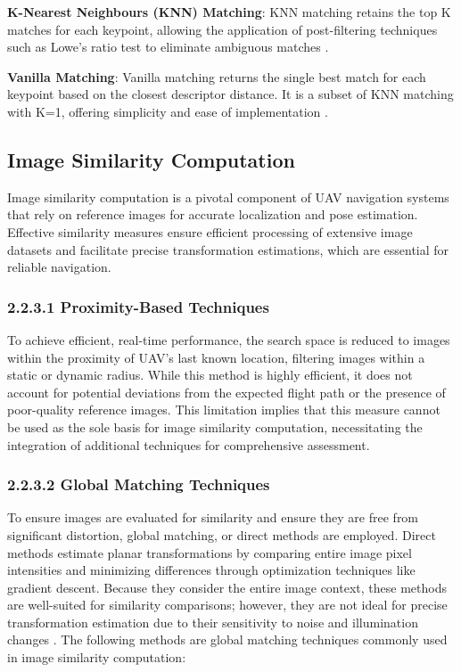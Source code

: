 \textbf{K-Nearest Neighbours (KNN) Matching}: KNN matching retains the top K matches for each keypoint, allowing the application of post-filtering techniques such as Lowe’s ratio test to eliminate ambiguous matches \cite{opencv_matcher_tutorial}.

\textbf{Vanilla Matching}: Vanilla matching returns the single best match for each keypoint based on the closest descriptor distance. It is a subset of KNN matching with K=1, offering simplicity and ease of implementation \cite{opencv_matcher_tutorial}.





\subsection{Image Similarity Computation}

Image similarity computation is a pivotal component of UAV navigation systems that rely on reference images for accurate localization and pose estimation. Effective similarity measures ensure efficient processing of extensive image datasets and facilitate precise transformation estimations, which are essential for reliable navigation.

\subsubsection{2.2.3.1 Proximity-Based Techniques}

To achieve efficient, real-time performance, the search space is reduced to images within the proximity of UAV's last known location, filtering images within a static or dynamic radius. While this method is highly efficient, it does not account for potential deviations from the expected flight path or the presence of poor-quality reference images. This limitation implies that this measure cannot be used as the sole basis for image similarity computation, necessitating the integration of additional techniques for comprehensive assessment.


\subsubsection{2.2.3.2 Global Matching Techniques}

To ensure images are evaluated for similarity and ensure they are free from significant distortion, global matching, or direct methods are employed. Direct methods estimate planar transformations by comparing entire image pixel intensities and minimizing differences through optimization techniques like gradient descent. Because they consider the entire image context, these methods are well-suited for similarity comparisons; however, they are not ideal for precise transformation estimation due to their sensitivity to noise and illumination changes \cite{GlobalLocal2023}. The following methods are global matching techniques commonly used in image similarity computation:


